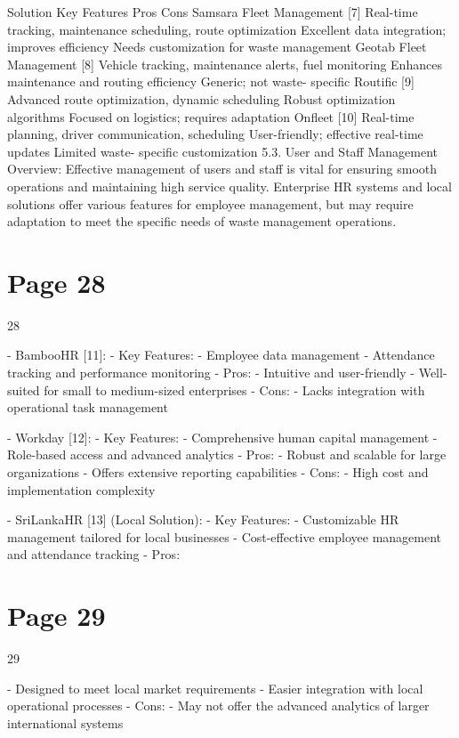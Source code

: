 \documentclass{article}
\begin{document}
Solution Key Features Pros Cons 
Samsara Fleet 
Management [7] 
Real-time tracking, 
maintenance 
scheduling, route 
optimization 
Excellent data 
integration; improves 
efficiency 
Needs customization 
for waste 
management 
Geotab Fleet 
Management [8] 
Vehicle tracking, 
maintenance alerts, 
fuel monitoring 
Enhances 
maintenance and 
routing efficiency 
Generic; not waste-
specific 
Routific [9] Advanced route 
optimization, 
dynamic scheduling 
Robust optimization 
algorithms 
Focused on logistics; 
requires adaptation 
Onfleet [10] Real-time planning, 
driver 
communication, 
scheduling 
User-friendly; 
effective real-time 
updates 
Limited waste-
specific 
customization 
5.3. User and Staff Management 
Overview:   
Effective management of users and staff is vital for ensuring smooth operations and 
maintaining high service quality. Enterprise HR systems and local solutions offer various 
features for employee management, but may require adaptation to meet the specific needs of 
waste management operations. 

\section*{Page 28}
   
 
 28  
 
 
- BambooHR [11]:   
  - Key Features:   
    - Employee data management   
    - Attendance tracking and performance monitoring   
  - Pros:   
    - Intuitive and user-friendly   
    - Well-suited for small to medium-sized enterprises   
  - Cons:   
    - Lacks integration with operational task management 
 
- Workday [12]:   
  - Key Features:   
    - Comprehensive human capital management   
    - Role-based access and advanced analytics   
  - Pros:   
    - Robust and scalable for large organizations   
    - Offers extensive reporting capabilities   
  - Cons:   
    - High cost and implementation complexity 
 
- SriLankaHR [13] (Local Solution):   
  - Key Features:   
    - Customizable HR management tailored for local businesses   
    - Cost-effective employee management and attendance tracking   
  - Pros:   

\section*{Page 29}
   
 
 29  
 
    - Designed to meet local market requirements   
    - Easier integration with local operational processes   
  - Cons:   
    - May not offer the advanced analytics of larger international systems 
 
\end{document}
